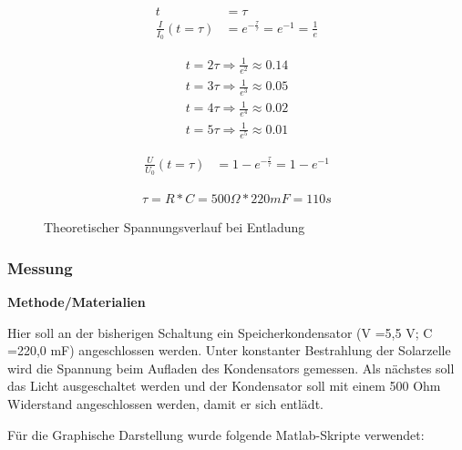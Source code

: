         \begin{align}
            t &= \tau \\
            \frac{I}{I_0} (t = \tau) &= e^{-\frac{\tau}{\tau}} = e^{-1} = \frac{1}{e}
        \end{align}
        
        \begin{align}
            t = 2\tau \Rightarrow \frac{1}{e^2} \approx 0.14 \\
            t = 3\tau \Rightarrow \frac{1}{e^3} \approx 0.05 \\
            t = 4\tau \Rightarrow \frac{1}{e^4} \approx 0.02 \\
            t = 5\tau \Rightarrow \frac{1}{e^5} \approx 0.01
        \end{align}
        
        \begin{align}
            \frac{U}{U_0}(t=\tau) &= 1 - e^{-\frac{\tau}{\tau}} = 1 - e^{-1}
        \end{align}

        
        \begin{align}
            \tau = R * C = 500 \Omega * 220mF = 110s
        \end{align}
        
        \begin{figure}[H]
            \def\svgwidth{\textwidth}
            
            \caption{Theoretischer Spannungsverlauf bei Entladung}
        \end{figure}

        
    \subsubsection{Messung}                                             %
        \textbf{Methode/Materialien}
        \newline
        \par Hier soll an der bisherigen Schaltung ein Speicherkondensator (V =5,5 V; C =220,0 mF) angeschlossen
        werden. Unter konstanter Bestrahlung der Solarzelle wird die Spannung beim Aufladen des
        Kondensators gemessen. Als nächstes soll das Licht ausgeschaltet werden und der Kondensator soll mit
        einem 500 Ohm Widerstand angeschlossen werden, damit er sich entlädt.
        \par Für die Graphische Darstellung wurde folgende Matlab-Skripte verwendet:
        
